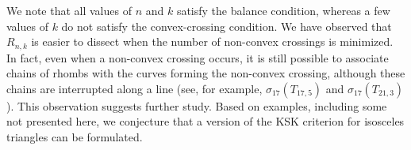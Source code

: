 \begin{rem}
We note that all values of \(n\) and \(k\) satisfy the balance condition, whereas a few values of \(k\) do not satisfy the convex-crossing condition. We have observed that \(R_{n,k}\) is easier to dissect when the number of non-convex crossings is minimized. In fact, even when a non-convex crossing occurs, it is still possible to associate chains of rhombs with the curves forming the non-convex crossing, although these chains are interrupted along a line (see, for example, \(\sigma_{17}(T_{17,5})\) and \(\sigma_{17}(T_{21,3})\)). This observation suggests further study. Based on examples, including some not presented here, we conjecture that a version of the KSK criterion for isosceles triangles can be formulated.
\end{rem}

